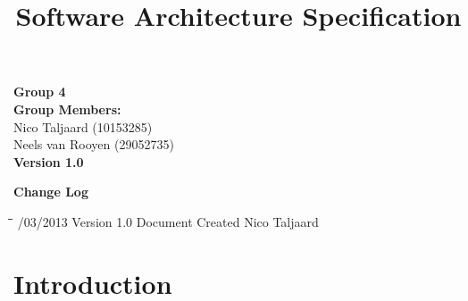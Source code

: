 \documentclass[12pt]{article}
\title{Software Architecture Specification}
\begin{document}

\maketitle

\vspace{4em}

\begin{center}%

  \LARGE {\bf Group 4}\\[2em]
  \LARGE {\bf Group Members:}\\[1em]
  \large
      Nico Taljaard			(10153285)	\\
      Neels van Rooyen		(29052735)	\\[6em]
      
      {\bf Version 1.0}
    
\end{center}%

\newpage

{\LARGE \bf Change Log}\\[2em]

\begin{tabbing}
\hspace*{3cm}\=\hspace*{3cm}\=\hspace*{8cm}\=\hspace*{3cm} /03/2013 \> Version 1.0 \> Document Created \> Nico Taljaard\\

\end{tabbing}

\newpage


\tableofcontents

\newpage


\section{Introduction}
\end{document}
